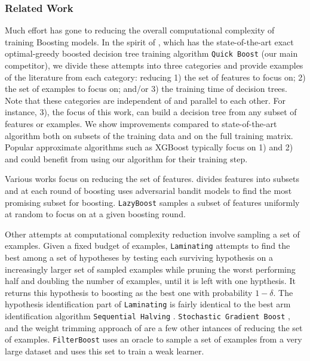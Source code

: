 \subsubsection{Related Work}\label{related-work}


Much effort has gone to reducing the overall computational complexity of
training Boosting models.
In the spirit of \citet{icml2013_appel13}, which has the state-of-the-art
exact optimal-greedy boosted decision tree training algorithm \texttt{Quick Boost}
(our main competitor), we divide these attempts into three categories and
provide examples of the literature from each category: reducing
1) the set of features to focus on;
2) the set of examples to focus on; and/or
3) the training time of decision trees.
Note that these categories are independent of and parallel to each other.
For instance, 3), the focus of this work, can build a decision tree from
any subset of features or examples.
We show improvements compared to state-of-the-art algorithm both on subsets
of the training data and on the full training matrix.
Popular approximate algorithms such as
XGBoost \citep{Chen:2016:XST:2939672.2939785}
typically focus on 1) and 2)
and could benefit from using our algorithm for their training step.

Various works \citep{4270071, PaulBiswajitAthithanEtAl} focus on reducing the set of features.
\citet{busafekete:in2p3-00614564} divides features into subsets
and at each round of boosting uses adversarial bandit models to find the most promising subset for boosting. \texttt{LazyBoost} \citep{Escudero:2001:ULW:2387364.2387381} samples a subset of features uniformly at random to focus on at a given boosting round. 

Other attempts at computational complexity reduction involve sampling a set of
examples.
Given a fixed budget of examples, \texttt{Laminating}
\citep{Dubout:2014:ASL:2627435.2638580} attempts to find the best among a set of
hypotheses by testing each surviving hypothesis on a increasingly larger set of
sampled examples while pruning the worst performing half and doubling the number of examples, until it is left
with one hypthesis. It returns this hypothesis to boosting as the best one with probability $1-\delta$. The hypothesis identification part of \texttt{Laminating} is fairly identical to the best arm identification algorithm \texttt{Sequential Halving} \citep{icml2013_karnin13}. \texttt{Stochastic Gradient Boost} \citep{FriedmanStochasticGB}, and the weight trimming approach of \citet{Friedman98additivelogistic} are a few other intances of reducing the set of examples. \texttt{FilterBoost} \citep{NIPS2007_3321} uses an oracle to sample a set of examples from a very large dataset and uses this set to train a weak learner.

